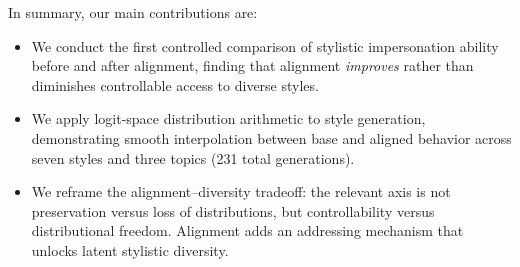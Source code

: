 In summary, our main contributions are:
\begin{itemize}[leftmargin=*,itemsep=0pt,topsep=0pt]
    \item We conduct the first controlled comparison of stylistic impersonation
    ability before and after alignment, finding that alignment \emph{improves}
    rather than diminishes controllable access to diverse styles.
    \item We apply logit-space distribution arithmetic to style generation,
    demonstrating smooth interpolation between base and aligned behavior across
    seven styles and three topics (231 total generations).
    \item We reframe the alignment--diversity tradeoff: the relevant axis is not
    preservation versus loss of distributions, but controllability versus
    distributional freedom. Alignment adds an addressing mechanism that unlocks
    latent stylistic diversity.
\end{itemize}
